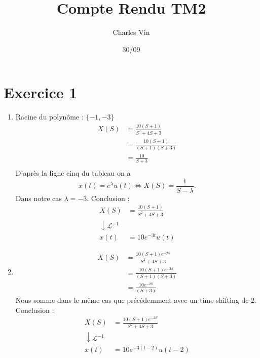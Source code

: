 \documentclass{article}
\title{Compte Rendu TM2}
\author{Charles Vin}
\date{30/09}
\theoremstyle{plain}%
\theoremstyle{definition}
\theoremstyle{remark}
\begin{document}
\maketitle

\section{Exercice 1}
\begin{enumerate}
    \item Racine du polynôme : $ \{-1, -3\} $ 
    \begin{align*}
        X(S) &= \frac{10 (S+1)}{S^2 + 4S + 3} \\
            &= \frac{10 (S+1)}{(S+1)(S+3)} \\
            &= \frac{10}{S+3}\\
    \end{align*}
    D'après la ligne cinq du tableau on a 
    \[
        x(t) = e^\lambda u(t) \Leftrightarrow X(S) = \frac{1}{S - \lambda }
    .\]
    Dans notre cas $ \lambda = -3 $. Conclusion : 
    \begin{align*}
        X(S) &= \frac{10 (S+1)}{S^2 + 4S + 3} \\
        \downarrow \mathcal{L}^{-1}& \\
            x(t) &= 10e^{-3t}u(t)
    \end{align*} 
    
    \item \begin{align*}
        X(S) &= \frac{10 (S+1)e^{-2S}}{S^2 + 4S + 3} \\
        &= \frac{10 (S+1)e^{-2S}}{(S+1)(S+3)} \\
        &= \frac{10e^{-2S}}{(S+3)} 
    \end{align*}
    Nous somme dans le même cas que précédemment avec un time shifting de $ 2 $. Conclusion :
    \begin{align*}
        X(S) &= \frac{10 (S+1)e^{-2S}}{S^2 + 4S + 3}\\
        \downarrow \mathcal{L}^{-1}& \\
            x(t) &= 10e^{-3(t-2)}u(t-2)
    \end{align*}
    

\end{enumerate}
\end{document}
